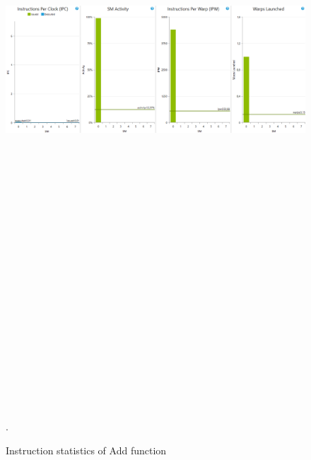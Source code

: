 \documentclass[oneside,openright,12pt,final,en]{mgr}
\begin{document}
\begin{figure}[H]
	\centering
	\includegraphics[width=\textwidth, height=26cm,keepaspectratio]{add_instructions}.
	\caption{Instruction statistics of Add function}
	\label{fig:add_instructions}
\end{figure}
\end{document}
